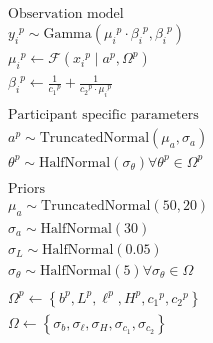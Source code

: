\documentclass[a4paper,12pt]{article}
\begin{document}
\begin{align*}
    &\text{Observation model} \\
    &{y_i}^{p}\sim \text{Gamma}\left({\mu_i}^{p}\cdot{\beta_i}^{p}, {\beta_i}^{p}\right) \\
    &{\mu_i}^{p} \gets \mathcal{F}\left({x_i}^{p} \mid a^{p}, {\Omega}^{p}\right) \\
    &{\beta_i}^{p} \gets \frac1{{c_1}^{p}} + \frac1{{c_2}^{p}\cdot{\mu_i}^{p}}\\\\
    &\text{Participant specific parameters} \\
    &a^{p} \sim \text{TruncatedNormal}\left({\mu_a}, {\sigma_a}\right)\\
    &{\theta}^{p} \sim \text{HalfNormal}\left({\sigma_{\theta}}\right) \forall \theta^{p} \in {\Omega}^{p}\\\\
    &\text{Priors} \\
    & {\mu_a} \sim \text{TruncatedNormal}\left(50, 20\right)\\
    &{\sigma_a} \sim \text{HalfNormal}\left(30\right)\\
    &{\sigma_L} \sim \text{HalfNormal}\left(0.05\right)\\
    &{\sigma_\theta} \sim \text{HalfNormal}\left(5\right) \forall {\sigma_\theta}\in \Omega\\\\
    &{\Omega}^{p} \gets \left\{{b}^{p}, {L}^{p}, {\ell}^{p}, {H}^{p}, {c_1}^{p}, {c_2}^{p}\right\}\\
    &\Omega \gets \left\{{\sigma_{b}},  {\sigma_{\ell}}, {\sigma_{H}}, {\sigma_{c_1}}, {\sigma_{c_2}}\right\}
\end{align*}
\end{document}
